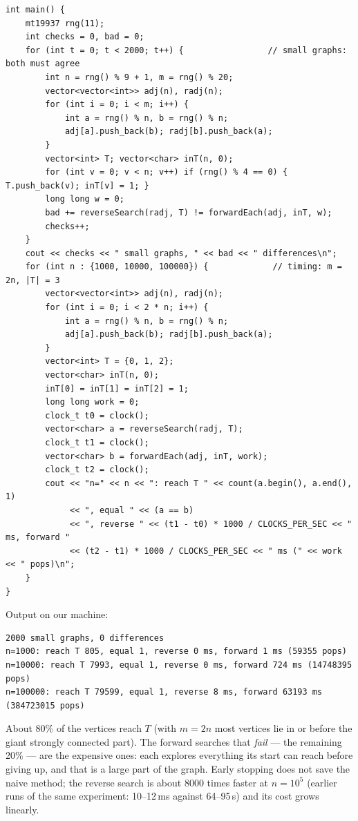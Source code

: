 \begin{solutionbox}
\begin{lstlisting}[style=cpp]
int main() {
    mt19937 rng(11);
    int checks = 0, bad = 0;
    for (int t = 0; t < 2000; t++) {                 // small graphs: both must agree
        int n = rng() % 9 + 1, m = rng() % 20;
        vector<vector<int>> adj(n), radj(n);
        for (int i = 0; i < m; i++) {
            int a = rng() % n, b = rng() % n;
            adj[a].push_back(b); radj[b].push_back(a);
        }
        vector<int> T; vector<char> inT(n, 0);
        for (int v = 0; v < n; v++) if (rng() % 4 == 0) { T.push_back(v); inT[v] = 1; }
        long long w = 0;
        bad += reverseSearch(radj, T) != forwardEach(adj, inT, w);
        checks++;
    }
    cout << checks << " small graphs, " << bad << " differences\n";
    for (int n : {1000, 10000, 100000}) {             // timing: m = 2n, |T| = 3
        vector<vector<int>> adj(n), radj(n);
        for (int i = 0; i < 2 * n; i++) {
            int a = rng() % n, b = rng() % n;
            adj[a].push_back(b); radj[b].push_back(a);
        }
        vector<int> T = {0, 1, 2};
        vector<char> inT(n, 0);
        inT[0] = inT[1] = inT[2] = 1;
        long long work = 0;
        clock_t t0 = clock();
        vector<char> a = reverseSearch(radj, T);
        clock_t t1 = clock();
        vector<char> b = forwardEach(adj, inT, work);
        clock_t t2 = clock();
        cout << "n=" << n << ": reach T " << count(a.begin(), a.end(), 1)
             << ", equal " << (a == b)
             << ", reverse " << (t1 - t0) * 1000 / CLOCKS_PER_SEC << " ms, forward "
             << (t2 - t1) * 1000 / CLOCKS_PER_SEC << " ms (" << work << " pops)\n";
    }
}
\end{lstlisting}
Output on our machine:
\begin{lstlisting}[style=trace]
2000 small graphs, 0 differences
n=1000: reach T 805, equal 1, reverse 0 ms, forward 1 ms (59355 pops)
n=10000: reach T 7993, equal 1, reverse 0 ms, forward 724 ms (14748395 pops)
n=100000: reach T 79599, equal 1, reverse 8 ms, forward 63193 ms (384723015 pops)
\end{lstlisting}
About 80\% of the vertices reach $T$ (with $m = 2n$ most vertices lie in or before the giant strongly connected part). The forward searches that \emph{fail} --- the remaining 20\% --- are the expensive ones: each explores everything its start can reach before giving up, and that is a large part of the graph. Early stopping does not save the naive method; the reverse search is about $8000$ times faster at $n = 10^5$ (earlier runs of the same experiment: 10--12\,ms against 64--95\,s) and its cost grows linearly.
\end{solutionbox}

